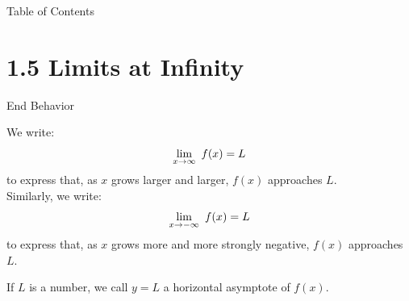

 \begin{frame}{Table of Contents}
\mapofcontentsA{\ae}
 \end{frame}
\section{1.5 Limits at Infinity}
\begin{frame}[t]{End Behavior}

We write:
\[\displaystyle\lim_{x \to \infty}~f(x)=L\]
to express that, as $x$ grows larger and larger, $f(x)$ approaches $L$.\\[1em]
\vfill
Similarly, we write:                                                                                                                                                                                                                                                                                                                                                                                        \[\displaystyle\lim_{x \to -\infty}~f(x)=L\]
to express that, as $x$ grows more and more strongly negative, $f(x)$ approaches $L$.

\pause\vfill
If $L$ is a number, we call $y=L$ a \alert{horizontal asymptote} of $f(x)$.
\end{frame}
